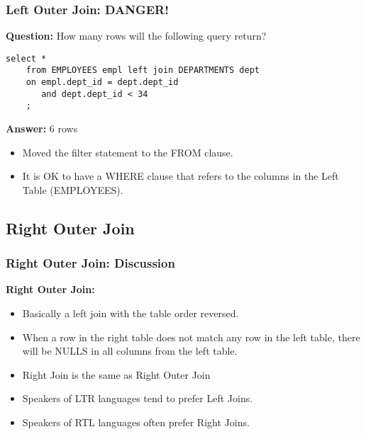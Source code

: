 \documentclass{beamer}
\begin{document}
\begin{frame}[fragile]
  \frametitle{Left Outer Join: DANGER!}
    \textbf{Question:} How many rows will the following query return?
  \bigskip

  \begin{lstlisting}[title={\tiny Source: https://github.com/Choens/sql-survival-guide/blob/master/sql/04-joins/left-join.sql}]
    select *
    from EMPLOYEES empl left join DEPARTMENTS dept
    on empl.dept_id = dept.dept_id
       and dept.dept_id < 34
    ;
  \end{lstlisting}
  
  \bigskip
  \pause 
  \textbf{Answer:} 6 rows
  \begin{itemize}
  \item Moved the filter statement to the FROM clause.
  \item It is OK to have a WHERE clause that refers to the columns in
    the Left Table (EMPLOYEES).
  \end{itemize}

\end{frame}



\subsection{Right Outer Join} %

\begin{frame}
  \frametitle{Right Outer Join: Discussion}
  
  \textbf{Right Outer Join:}

  \bigskip
  \begin{itemize}
  \item Basically a left join with the table order reversed.
  \item When a row in the right table does not match any row in the
    left table, there will be NULLS in all columns from the left
    table.
  \item Right Join is the same as Right Outer Join
  \item Speakers of LTR languages tend to prefer Left Joins.
  \item Speakers of RTL languages often prefer  Right Joins.
  \end{itemize}

\end{frame}
\end{document}
